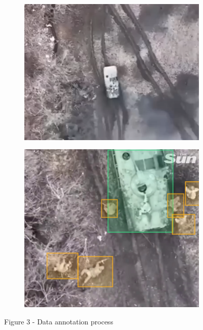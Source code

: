 \begin{figure}[H]
    \centering
    \begin{subfigure}[b]{0.45\textwidth}
        \centering
        \includegraphics[height=0.9\linewidth]{assets/13}
    \end{subfigure}\hfill
    \begin{subfigure}[b]{0.45\textwidth}
        \centering
        \includegraphics[height=0.9\linewidth]{assets/14}
    \end{subfigure}
	\caption*{Figure 3 - Data annotation process}
\end{figure}

